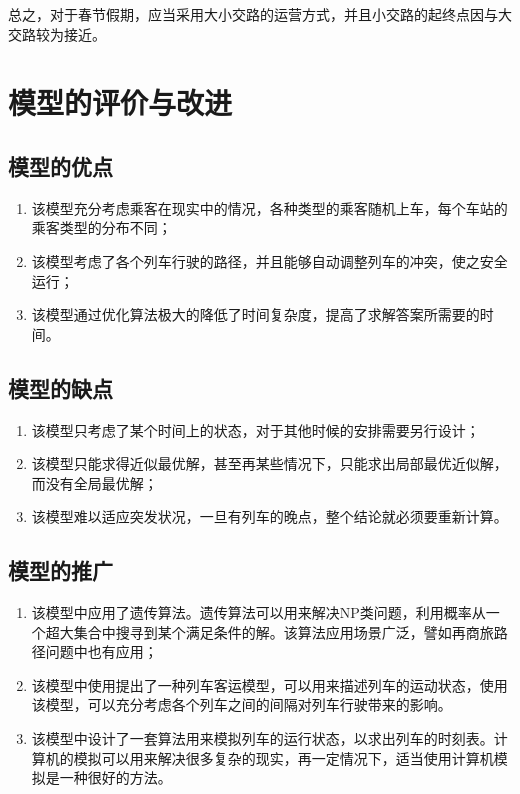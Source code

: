 总之，对于春节假期，应当采用大小交路的运营方式，并且小交路的起终点因与大交路较为接近。


%
%

\section{模型的评价与改进}

\subsection{模型的优点}

\begin{enumerate}
    \item 该模型充分考虑乘客在现实中的情况，各种类型的乘客随机上车，每个车站的乘客类型的分布不同；
    \item 该模型考虑了各个列车行驶的路径，并且能够自动调整列车的冲突，使之安全运行；
    \item 该模型通过优化算法极大的降低了时间复杂度，提高了求解答案所需要的时间。
\end{enumerate}

\subsection{模型的缺点}

\begin{enumerate}
    \item 该模型只考虑了某个时间上的状态，对于其他时候的安排需要另行设计；
    \item 该模型只能求得近似最优解，甚至再某些情况下，只能求出局部最优近似解，而没有全局最优解；
    \item 该模型难以适应突发状况，一旦有列车的晚点，整个结论就必须要重新计算。
\end{enumerate}

\subsection{模型的推广}

\begin{enumerate}
    \item 该模型中应用了遗传算法。遗传算法可以用来解决NP类问题，利用概率从一个超大集合中搜寻到某个满足条件的解。该算法应用场景广泛，譬如再商旅路径问题中也有应用；
    \item 该模型中使用提出了一种列车客运模型，可以用来描述列车的运动状态，使用该模型，可以充分考虑各个列车之间的间隔对列车行驶带来的影响。
    \item 该模型中设计了一套算法用来模拟列车的运行状态，以求出列车的时刻表。计算机的模拟可以用来解决很多复杂的现实，再一定情况下，适当使用计算机模拟是一种很好的方法。
\end{enumerate}